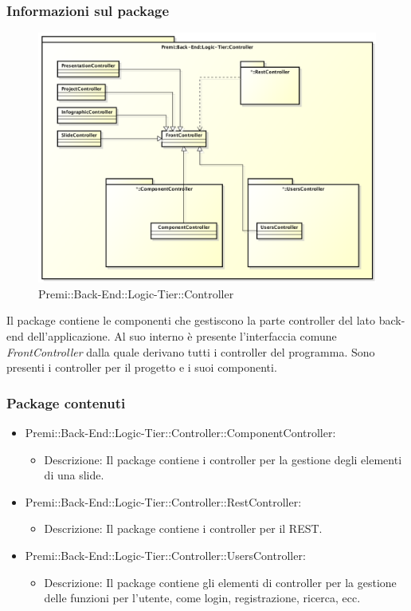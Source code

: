 	\subsubsection*{Informazioni sul package}
	\begin{figure}[h]
		\centering
		\includegraphics[width=0.9\linewidth]{img/back-end_logic-tier_controller}
		\caption[Premi::Back-End::Logic-Tier::Controller]{Premi::Back-End::Logic-Tier::Controller}
	\end{figure}
	Il package contiene le componenti che gestiscono la parte controller del lato \gls{back-end} dell'applicazione. Al suo interno è presente l'interfaccia comune \textit{FrontController} dalla quale derivano tutti i controller del programma.
	Sono presenti i controller per il progetto e i suoi componenti.

	\subsubsection*{Package contenuti}
		\begin{itemize}
			\item Premi::Back-End::Logic-Tier::Controller::ComponentController:
			\begin{itemize}
				\item Descrizione: Il package contiene i controller per la gestione degli elementi di una \gls{slide}.
			\end{itemize}
			
			\item Premi::Back-End::Logic-Tier::Controller::RestController:
			\begin{itemize}
				\item Descrizione: Il package contiene i controller per il \gls{REST}.
			\end{itemize}
			
			\item Premi::Back-End::Logic-Tier::Controller::UsersController:
			\begin{itemize}
				\item Descrizione: Il package contiene gli elementi di controller per la gestione delle funzioni per l'utente, come login, registrazione, ricerca, ecc.
			\end{itemize}
		\end{itemize}
		
